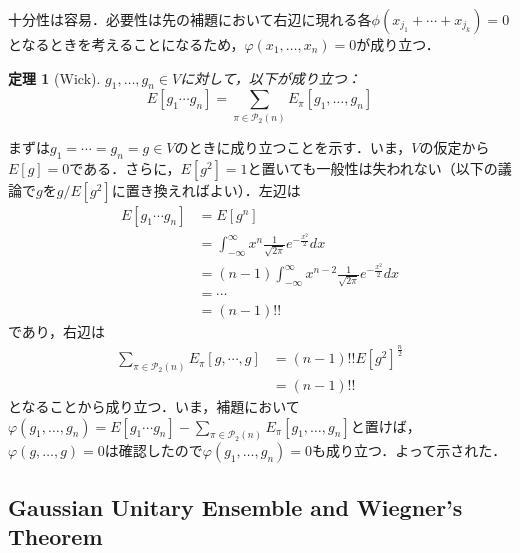 \documentclass{ltjsarticle}
\makeatletter
\theoremstyle{mystyle1}
\newtheorem{thm}[dfn]{定理}
\theoremstyle{mystyle2}
\theoremstyle{mystyle3}
\renewenvironment{proof}[1][\proofname]{\par
  \pushQED{\qed}%
  \normalfont
  \topsep6\p@\@plus6\p@ \trivlist
  \item[\hskip\labelsep{\bfseries\sffamily #1}]\ignorespaces
}{%
  \popQED\endtrivlist\@endpefalse
}
\renewcommand\proofname{証明}
\makeatother
\begin{document}
\begin{proof}
    十分性は容易．必要性は先の補題において右辺に現れる各$\phi(x_{j_1}+\cdots+x_{j_k})=0$となるときを考えることになるため，$\varphi(x_1,\ldots,x_n)=0$が成り立つ．
\end{proof}

\begin{thm}[Wick]
    $g_1,\ldots,g_n\in V$に対して，以下が成り立つ：
    \begin{equation}
        E[g_1\cdots g_n]=\sum_{\pi\in\mathcal{P}_2(n)}E_\pi[g_1,\ldots,g_n]
    \end{equation}
\end{thm}

\begin{proof}
    まずは$g_1=\cdots=g_n=g\in V$のときに成り立つことを示す．いま，$V$の仮定から$E[g]=0$である．さらに，$E[g^2]=1$と置いても一般性は失われない（以下の議論で$g$を$g/E[g^2]$に置き換えればよい）．左辺は
    \begin{equation}
        \begin{split}
            E[g_1\cdots g_n]
            &=E[g^n] \\
            &=\int_{-\infty}^\infty x^n\frac{1}{\sqrt{2\pi}}e^{-\frac{x^2}{2}}dx \\
            &=(n-1)\int_{-\infty}^\infty x^{n-2}\frac{1}{\sqrt{2\pi}}e^{-\frac{x^2}{2}}dx \\
            &=\cdots \\
            &=(n-1)!!
        \end{split}
    \end{equation}
    であり，右辺は
    \begin{equation}
        \begin{split}
            \sum_{\pi\in\mathcal{P}_2(n)}E_\pi[g,\cdots,g]
            &=(n-1)!!E[g^2]^{\frac{n}{2}} \\
            &=(n-1)!!
        \end{split}
    \end{equation}
    となることから成り立つ．いま，補題において$\varphi(g_1,\ldots,g_n)=E[g_1\cdots g_n]-\sum_{\pi\in\mathcal{P}_2(n)}E_\pi[g_1,\ldots,g_n]$と置けば，$\varphi(g,\ldots,g)=0$は確認したので$\varphi(g_1,\ldots,g_n)=0$も成り立つ．よって示された．
\end{proof}

\subsection{Gaussian Unitary Ensemble and Wiegner's Theorem}
\end{document}
